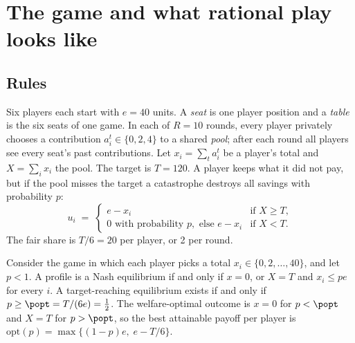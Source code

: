 \section{The game and what rational play looks like}
\label{sec:game}

\subsection{Rules}
Six players each start with $e=40$ units. A \emph{seat} is one player position and a
\emph{table} is the six seats of one game. In each of $R=10$ rounds, every player privately
chooses a contribution $a_i^t\in\{0,2,4\}$ to a shared \emph{pool}; after each round all
players see every seat's past contributions. Let $x_i=\sum_t a_i^t$ be a player's total and
$X=\sum_i x_i$ the pool. The target is $T=120$. A player keeps what it did not pay, but if
the pool misses the target a catastrophe destroys all savings with probability $p$:
\begin{equation}
u_i \;=\;
\begin{cases}
e-x_i & \text{if } X\ge T,\\
0 \text{ with probability } p, \text{ else } e-x_i & \text{if } X<T.
\end{cases}
\label{eq:payoff}
\end{equation}
The fair share is $T/6=20$ per player, or 2 per round.

\begin{proposition}
\label{prop:eq}
Consider the game in which each player picks a total $x_i\in\{0,2,\dots,40\}$, and let
$p<1$. A profile is a Nash equilibrium if and only if $x=0$, or $X=T$ and $x_i\le pe$ for
every $i$. A target-reaching equilibrium exists if and only if $p\ge\popt=T/(6e)=\tfrac12$.
The welfare-optimal outcome is $x=0$ for $p<\popt$ and $X=T$ for $p>\popt$, so the best
attainable payoff per player is $\mathrm{opt}(p)=\max\{(1-p)e,\;e-T/6\}$.
\end{proposition}

